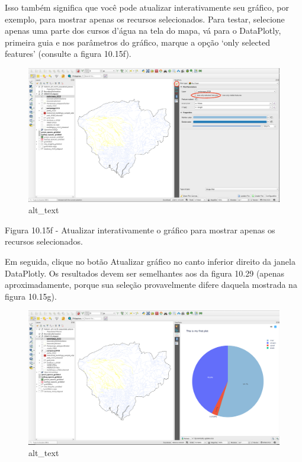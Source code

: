 \documentclass[
  portuguese,
]{krantz}
\begin{document}
Isso também significa que você pode atualizar interativamente seu gráfico, por exemplo, para mostrar apenas os recursos selecionados. Para testar, selecione apenas uma parte dos cursos d'água na tela do mapa, vá para o DataPlotly, primeira guia e nos parâmetros do gráfico, marque a opção `only selected features' (consulte a figura 10.15f).

\begin{figure}
\centering
\includegraphics{media/modulo10/fig1015_f.png}
\caption{alt\_text}
\end{figure}

Figura 10.15f - Atualizar interativamente o gráfico para mostrar apenas os recursos selecionados.

Em seguida, clique no botão Atualizar gráfico no canto inferior direito da janela DataPlotly. Os resultados devem ser semelhantes aos da figura 10.29 (apenas aproximadamente, porque sua seleção provavelmente difere daquela mostrada na figura 10.15g).

\begin{figure}
\centering
\includegraphics{media/modulo10/fig1015_g.png}
\caption{alt\_text}
\end{figure}
\end{document}
